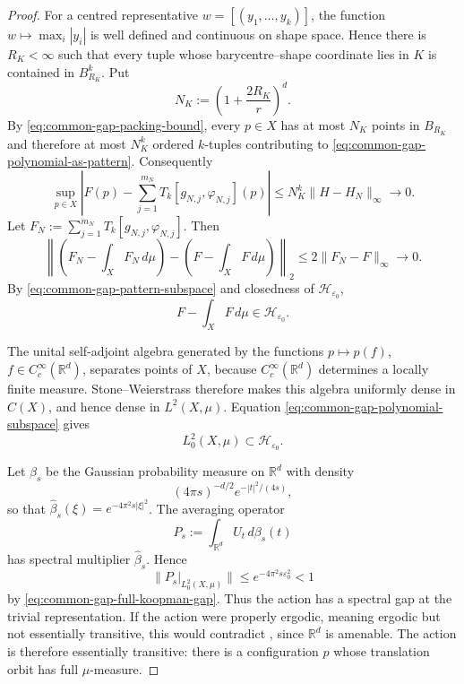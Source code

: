 \documentclass[11pt,reqno,a4paper]{amsart}
\numberwithin{equation}{section}
\theoremstyle{compact}
\theoremstyle{definition}
\theoremstyle{definition}
\begin{document}
\begin{proof}
For a centred representative $w=[(y_1,\ldots,y_k)]$, the function
$w\mapsto\max_i|y_i|$ is well defined and continuous on shape space.  Hence
there is $R_K<\infty$ such that every tuple whose barycentre--shape coordinate
lies in $K$ is contained in $B_{R_K}^k$.  Put
\[
  N_K:=\left(1+\frac{2R_K}{r}\right)^d.
\]
By \eqref{eq:common-gap-packing-bound}, every $p\in X$ has at most $N_K$
points in $B_{R_K}$ and therefore at most $N_K^k$ ordered $k$-tuples
contributing to \eqref{eq:common-gap-polynomial-as-pattern}.  Consequently
\begin{equation}\label{eq:common-gap-polynomial-approximation}
  \sup_{p\in X}
  \left|
    F(p)-\sum_{j=1}^{m_N}T_k[g_{N,j},\varphi_{N,j}](p)
  \right|
  \leq N_K^k\|H-H_N\|_\infty
  \longrightarrow0.
\end{equation}
Let
$F_N:=\sum_{j=1}^{m_N}T_k[g_{N,j},\varphi_{N,j}]$.  Then
\[
  \left\|(F_N-\textstyle\int_XF_N\,d\mu)
       -(F-\textstyle\int_XF\,d\mu)\right\|_2
  \leq2\|F_N-F\|_\infty\longrightarrow0.
\]
By \eqref{eq:common-gap-pattern-subspace} and closedness of
$\mathcal H_{\varepsilon_0}$,
\begin{equation}\label{eq:common-gap-polynomial-subspace}
  F-\int_XF\,d\mu\in\mathcal H_{\varepsilon_0}.
\end{equation}

The unital self-adjoint algebra generated by the functions
$p\mapsto p(f)$, $f\in C_c^\infty(\mathbb R^d)$, separates points of $X$,
because $C_c^\infty(\mathbb R^d)$ determines a locally finite measure.
Stone--Weierstrass therefore makes this algebra uniformly dense in $C(X)$,
and hence dense in $L^2(X,\mu)$.  Equation
\eqref{eq:common-gap-polynomial-subspace} gives
\begin{equation}\label{eq:common-gap-full-koopman-gap}
  L_0^2(X,\mu)
  \subset
  \mathcal H_{\varepsilon_0}.
\end{equation}

Let $\beta_s$ be the Gaussian probability measure on $\mathbb R^d$ with
density
\[
  (4\pi s)^{-d/2}e^{-|t|^2/(4s)},
\]
so that
$\widehat\beta_s(\xi)=e^{-4\pi^2s|\xi|^2}$.  The averaging operator
\[
  P_s:=\int_{\mathbb R^d}U_t\,d\beta_s(t)
\]
has spectral multiplier $\widehat\beta_s$.  Hence
\begin{equation}\label{eq:common-gap-gaussian-contraction}
  \|P_s|_{L_0^2(X,\mu)}\|
  \leq e^{-4\pi^2s\varepsilon_0^2}<1
\end{equation}
by \eqref{eq:common-gap-full-koopman-gap}.  Thus the action has a spectral gap
at the trivial representation.  If the action were properly ergodic, meaning
ergodic but not essentially transitive, this would contradict
\cite[Remark~11.2(2)]{Nev06}, since $\mathbb R^d$ is amenable.  The action is
therefore essentially transitive: there is a configuration $p$ whose
translation orbit has full $\mu$-measure.


\end{proof}
\end{document}
